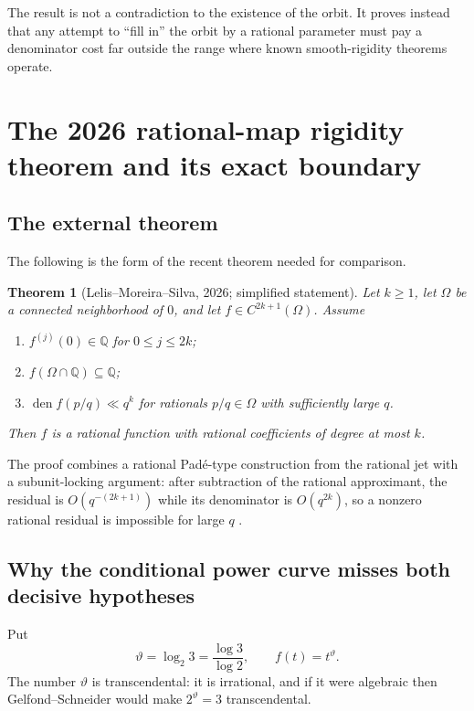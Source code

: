 \documentclass[11pt]{article}
\newtheorem{theorem}{Theorem}[section]
\theoremstyle{definition}
\theoremstyle{remark}
\newcommand{\Q}{\mathbb Q}
\newcommand{\den}{\operatorname{den}}
\begin{document}
The result is not a contradiction to the existence of the orbit.  It proves instead that
any attempt to ``fill in'' the orbit by a rational parameter must pay a denominator cost far
outside the range where known smooth-rigidity theorems operate.

\section{The 2026 rational-map rigidity theorem and its exact boundary}
\label{sec:lelis}

\subsection{The external theorem}

The following is the form of the recent theorem needed for comparison.

\begin{theorem}[Lelis--Moreira--Silva, 2026; simplified statement]
\label{thm:LMS}
Let $k\ge1$, let $\Omega$ be a connected neighborhood of $0$, and let
$f\in C^{2k+1}(\Omega)$.  Assume
\begin{enumerate}[label=(\roman*),leftmargin=2.2em]
\item $f^{(j)}(0)\in\Q$ for $0\le j\le2k$;
\item $f(\Omega\cap\Q)\subseteq\Q$;
\item $\den f(p/q)\ll q^k$ for rationals $p/q\in\Omega$ with sufficiently large $q$.
\end{enumerate}
Then $f$ is a rational function with rational coefficients of degree at most $k$.
\end{theorem}

The proof combines a rational Pad\'e-type construction from the rational jet with a
subunit-locking argument: after subtraction of the rational approximant, the residual is
$O(q^{-(2k+1)})$ while its denominator is $O(q^{2k})$, so a nonzero rational residual is
impossible for large $q$ \cite{LelisMoreiraSilva2026}.

\subsection{Why the conditional power curve misses both decisive hypotheses}

Put
\[
 \vartheta=\log_2 3=\frac{\log3}{\log2},
 \qquad f(t)=t^\vartheta.
\]
The number $\vartheta$ is transcendental: it is irrational, and if it were algebraic then
Gelfond--Schneider would make $2^\vartheta=3$ transcendental.
\end{document}
